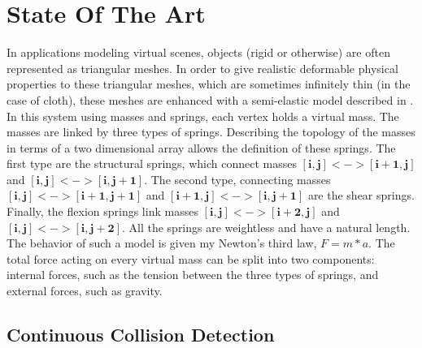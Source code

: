 \chapter{State Of The Art}
\label{chapter:sota}

In applications modeling virtual scenes, objects (rigid or otherwise) are often represented as triangular meshes. In order to give realistic deformable physical properties to these triangular meshes, which are sometimes infinitely thin (in the case of cloth), these meshes are enhanced with a semi-elastic model described in \cite{provot95}. In this system using masses and springs, each vertex holds a virtual mass. The masses are linked by three types of springs. Describing the topology of the masses in terms of a two dimensional array allows the definition of these springs. The first type are the structural springs, which connect masses $\mathbf{[i, j] <-> [i + 1, j]}$ and $\mathbf{[i, j] <-> [i, j + 1]}$. The second type, connecting masses $\mathbf{[i, j] <-> [i + 1, j + 1]}$ and $\mathbf{[i + 1, j] <-> [i, j + 1]}$ are the shear springs. Finally, the flexion springs link masses $\mathbf{[i, j] <-> [i + 2, j]}$ and $\mathbf{[i, j] <-> [i, j + 2]}$. All the springs are weightless and have a natural length. The behavior of such a model is given my Newton's third law, $F = m * a$. The total force acting on every virtual mass can be split into two components: internal forces, such as the tension between the three types of springs, and external forces, such as gravity.



\section{Continuous Collision Detection}
\label{sub-sec:ccd}

